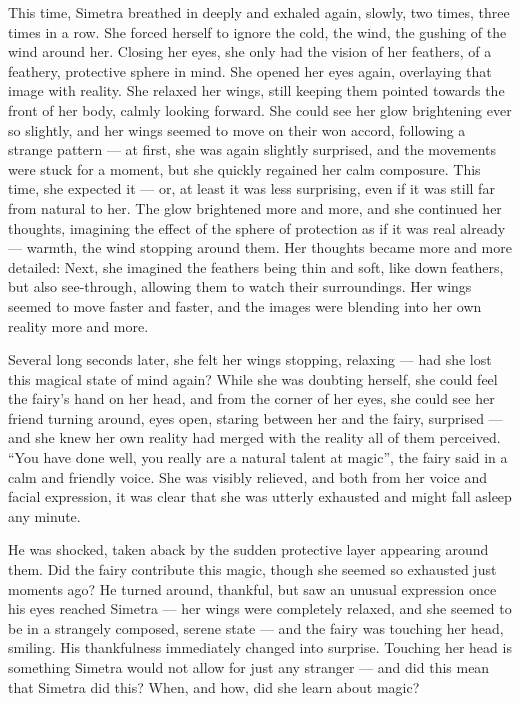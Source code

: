This time, Simetra breathed in deeply and exhaled again, slowly, two times, three times in a row. She forced herself to ignore the cold, the wind, the gushing of the wind around her. Closing her eyes, she only had the vision of her feathers, of a feathery, protective sphere in mind. She opened her eyes again, overlaying that image with reality. She relaxed her wings, still keeping them pointed towards the front of her body, calmly looking forward. She could see her glow brightening ever so slightly, and her wings seemed to move on their won accord, following a strange pattern --- at first, she was again slightly surprised, and the movements were stuck for a moment, but she quickly regained her calm composure. This time, she expected it --- or, at least it was less surprising, even if it was still far from natural to her. The glow brightened more and more, and she continued her thoughts, imagining the effect of the sphere of protection as if it was real already --- warmth, the wind stopping around them. Her thoughts became more and more detailed: Next, she imagined the feathers being thin and soft, like down feathers, but also see-through, allowing them to watch their surroundings. Her wings seemed to move faster and faster, and the images were blending into her own reality more and more.

Several long seconds later, she felt her wings stopping, relaxing --- had she lost this magical state of mind again? While she was doubting herself, she could feel the fairy's hand on her head, and from the corner of her eyes, she could see her friend turning around, eyes open, staring between her and the fairy, surprised --- and she knew her own reality had merged with the reality all of them perceived. \enquote{You have done well, you really are a natural talent at magic}, the fairy said in a calm and friendly voice. She was visibly relieved, and both from her voice and facial expression, it was clear that she was utterly exhausted and might fall asleep any minute.

\froufrou{}

He was shocked, taken aback by the sudden protective layer appearing around them. Did the fairy contribute this magic, though she seemed so exhausted just moments ago? He turned around, thankful, but saw an unusual expression once his eyes reached Simetra --- her wings were completely relaxed, and she seemed to be in a strangely composed, serene state --- and the fairy was touching her head, smiling. His thankfulness immediately changed into surprise. Touching her head is something Simetra would not allow for just any stranger --- and did this mean that Simetra did this? When, and how, did she learn about magic?

